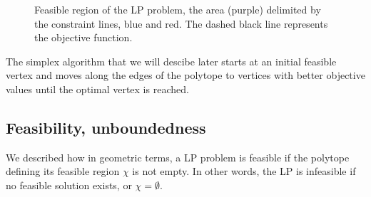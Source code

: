 \begin{figure}
    \centering
    \caption{Feasible region of the LP problem, the area (purple) delimited by the constraint lines, blue and red. The dashed black line represents the objective function.}
\end{figure}\label{fig:lp_geom}

The simplex algorithm that we will descibe later starts at an initial feasible vertex and moves along the edges of the polytope to vertices with better objective values until the optimal vertex is reached.

\subsection{Feasibility, unboundedness}\label{feasibility}
We described how in geometric terms, a LP problem is feasible if the polytope defining its feasible region $ \chi $ is not empty. In other words, the LP is infeasible if no feasible solution exists, or $\chi = \emptyset$.

